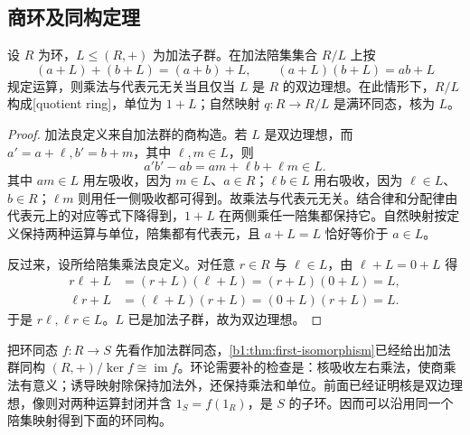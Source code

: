 \subsection{商环及同构定理}
\label{b1:subsec:1002:02}
\begin{proposition}\label{b1:prop:quotient-ring}
	设 \(R\) 为环，\(L\leq(R,+)\) 为加法子群。在加法陪集集合 \(R/L\) 上按
	\[
		(a+L)+(b+L)=(a+b)+L,\qquad (a+L)(b+L)=ab+L
	\]
	规定运算，则乘法与代表元无关当且仅当 \(L\) 是 \(R\) 的双边理想。在此情形下，\(R/L\) 构成[quotient ring]，单位为 \(1+L\)；自然映射 \(q:R\rightarrow R/L\) 是满环同态，核为 \(L\)。
\end{proposition}
\begin{proof}
	加法良定义来自加法群的商构造。若 \(L\) 是双边理想，而 \(a'=a+\ell,b'=b+m\)，其中 \(\ell,m\in L\)，则
	\[
		a'b'-ab=am+\ell b+\ell m\in L.
	\]
	其中 \(am\in L\) 用左吸收，因为 \(m\in L\)、\(a\in R\)；\(\ell b\in L\) 用右吸收，因为 \(\ell\in L\)、\(b\in R\)；\(\ell m\) 则用任一侧吸收都可得到。故乘法与代表元无关。结合律和分配律由代表元上的对应等式下降得到，\(1+L\) 在两侧乘任一陪集都保持它。自然映射按定义保持两种运算与单位，陪集都有代表元，且 \(a+L=L\) 恰好等价于 \(a\in L\)。

	反过来，设所给陪集乘法良定义。对任意 \(r\in R\) 与 \(\ell\in L\)，由 \(\ell+L=0+L\) 得
	\[
		\begin{aligned}
			r\ell+L&=(r+L)(\ell+L)=(r+L)(0+L)=L,\\
			\ell r+L&=(\ell+L)(r+L)=(0+L)(r+L)=L.
		\end{aligned}
	\]
	于是 \(r\ell,\ell r\in L\)。\(L\) 已是加法子群，故为双边理想。
\end{proof}

把环同态 \(f:R\to S\) 先看作加法群同态，\cref{b1:thm:first-isomorphism}已经给出加法群同构 \((R,+)/\ker f\cong\operatorname{im}f\)。环论需要补的检查是：核吸收左右乘法，使商乘法有意义；诱导映射除保持加法外，还保持乘法和单位。前面已经证明核是双边理想，像则对两种运算封闭并含 \(1_S=f(1_R)\)，是 \(S\) 的子环。因而可以沿用同一个陪集映射得到下面的环同构。

